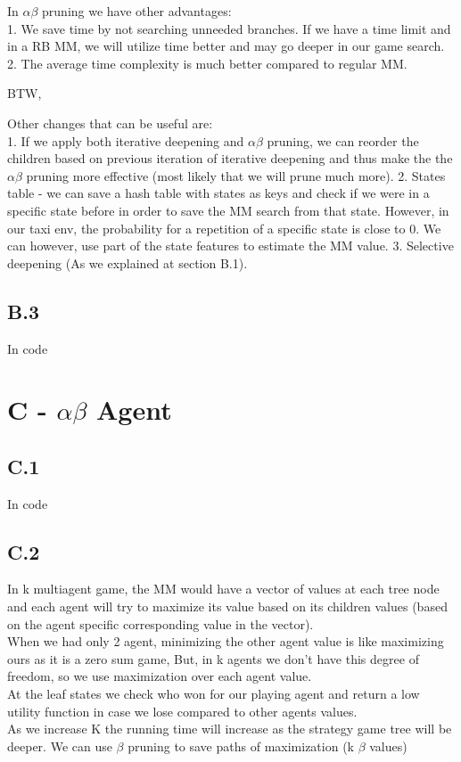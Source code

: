 \documentclass[12pt]{article}
\begin{document}
In $\alpha\beta$ pruning we have other advantages:\\
1. We save time by not searching unneeded branches. If we have a time limit and in a RB MM, we will utilize time better and may go deeper in our game search.
2. The average time complexity is much better compared to regular MM.

BTW, 

Other changes that can be useful are:\\
1. If we apply both iterative deepening and $\alpha\beta$ pruning, we can reorder the children based on previous iteration of iterative deepening and thus make the the $\alpha\beta$ pruning more effective (most likely that we will prune much more).
2. States table - we can save a hash table with states as keys and check if we were in a specific state before in order to save the MM search from that state. However, in our taxi env, the probability for a repetition of a specific state is close to 0. We can however, use part of the state features to estimate the MM value.
3. Selective deepening (As we explained at section B.1).

\subsection*{B.3}
In code 

\section*{C - $\alpha\beta$ Agent}

\subsection*{C.1}
In code 

\subsection*{C.2}
In k multiagent game, the MM would have a vector of values at each tree node and each agent will try to maximize its value based on its children values (based on the agent specific corresponding value in the vector).\\
When we had only 2 agent, minimizing the other agent value is like maximizing ours as it is a zero sum game, But, in k agents we don't have this degree of freedom, so we use maximization over each agent value.\\
At the leaf states we check who won for our playing agent and return a low utility function in case we lose compared to other agents values.\\
As we increase K the running time will increase as the strategy game tree  will be deeper. We can use $\beta$ pruning to save paths of maximization (k $\beta$ values)\\
\end{document}
